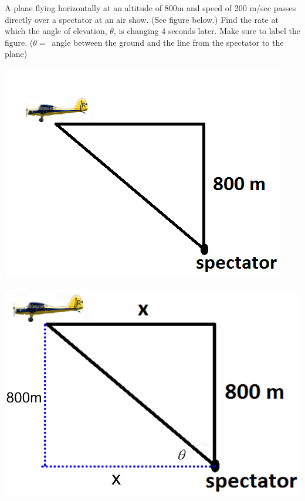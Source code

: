 \documentclass[nooutcomes]{ximera}
\begin{document}
\begin{problem}
A plane flying horizontally at an altitude of 800m and speed of 200 m/sec passes directly over a spectator at an air show. (See figure below.)  Find the rate at which the angle of elevation, $\theta$, is changing 4 seconds later. Make sure to label the figure. ($\theta =$\ angle between the ground and the line from the spectator to the plane)   

	\begin{image}
	\includegraphics[scale=.5]{Figure6.png}
	\end{image}
\begin{freeResponse} \hfil
	\begin{image}
	\includegraphics[scale=.3]{Figure7.png}
	\end{image}


\end{freeResponse}
\end{problem}
\end{document}
